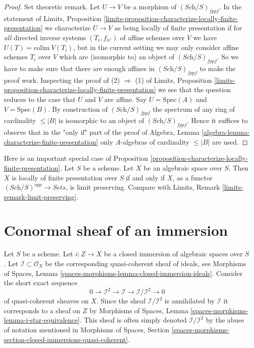 \begin{proof}
\medskip\noindent
Set theoretic remark. Let $U \to V$ be a morphism of
$(\textit{Sch}/S)_{fppf}$. In the statement of
Limits, Proposition
\ref{limits-proposition-characterize-locally-finite-presentation}
we characterize $U \to V$ as being locally of finite presentation
if for {\it all} directed inverse systems $(T_i, f_{ii'})$ of affine schemes
over $V$ we have $U(T) = \text{colim}\ V(T_i)$, but in the current setting
we may only consider affine schemes $T_i$ over $V$ which are (isomorphic to)
an object of $(\textit{Sch}/S)_{fppf}$. So we have to make sure that there
are enough affines in $(\textit{Sch}/S)_{fppf}$ to make the proof work.
Inspecting the proof of (2) $\Rightarrow$ (1) of
Limits, Proposition
\ref{limits-proposition-characterize-locally-finite-presentation}
we see that the question reduces to the case that $U$ and $V$ are affine.
Say $U = \text{Spec}(A)$ and $V = \text{Spec}(B)$. By construction
of $(\textit{Sch}/S)_{fppf}$ the spectrum of any ring of cardinality
$\leq |B|$ is isomorphic to an object of $(\textit{Sch}/S)_{fppf}$.
Hence it suffices to observe that in the "only if" part of the proof of
Algebra, Lemma \ref{algebra-lemma-characterize-finite-presentation}
only $A$-algebras of cardinality $\leq |B|$ are used.
\end{proof}

\begin{remark}
\label{remark-limit-preserving}
Here is an important special case of
Proposition \ref{proposition-characterize-locally-finite-presentation}.
Let $S$ be a scheme. Let $X$ be an algebraic space over $S$.
Then $X$ is locally of finite presentation over $S$ if and only
if $X$, as a functor $(\textit{Sch}/S)^{opp} \to \textit{Sets}$,
is limit preserving. Compare with
Limits, Remark \ref{limits-remark-limit-preserving}.
\end{remark}











\section{Conormal sheaf of an immersion}
\label{section-conormal-sheaf}

\noindent
Let $S$ be a scheme. Let $i : Z \to X$ be a closed immersion of algebraic
spaces over $S$. Let $\mathcal{I} \subset \mathcal{O}_X$ be the corresponding
quasi-coherent sheaf of ideals, see
Morphisms of Spaces,
Lemma \ref{spaces-morphisms-lemma-closed-immersion-ideals}.
Consider the short exact sequence
$$
0 \to \mathcal{I}^2 \to \mathcal{I} \to \mathcal{I}/\mathcal{I}^2 \to 0
$$
of quasi-coherent sheaves on $X$. Since the sheaf $\mathcal{I}/\mathcal{I}^2$
is annihilated by $\mathcal{I}$ it corresponds to a sheaf on $Z$ by
Morphisms of Spaces, Lemma \ref{spaces-morphisms-lemma-i-star-equivalence}.
This sheaf is often simply denoted $\mathcal{I}/\mathcal{I}^2$ by the abuse
of notation mentioned in
Morphisms of Spaces,
Section \ref{spaces-morphisms-section-closed-immersions-quasi-coherent}.

